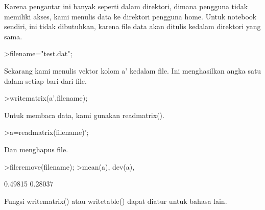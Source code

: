 \documentclass[a4paper,10pt]{article}
\begin{document}
\begin{eulernotebook}
\begin{eulercomment}
\begin{eulercomment}
\begin{eulercomment}
\begin{eulercomment}
\begin{eulercomment}
\begin{eulercomment}
\begin{eulercomment}
Karena pengantar ini banyak seperti dalam direktori, dimana pengguna
tidak memiliki akses, kami menulis data ke direktori pengguna home.
Untuk notebook sendiri, ini tidak dibutuhkan, karena file data akan
ditulis kedalam direktori yang sama.
\end{eulercomment}
\begin{eulerprompt}
>filename="test.dat";
\end{eulerprompt}
\begin{eulercomment}
Sekarang kami menulis vektor kolom a' kedalam file. Ini menghasilkan
angka satu dalam setiap bari dari file.
\end{eulercomment}
\begin{eulerprompt}
>writematrix(a',filename);
\end{eulerprompt}
\begin{eulercomment}
Untuk membaca data, kami gunakan readmatrix().
\end{eulercomment}
\begin{eulerprompt}
>a=readmatrix(filename)';
\end{eulerprompt}
\begin{eulercomment}
Dan menghapus file.
\end{eulercomment}
\begin{eulerprompt}
>fileremove(filename);
>mean(a), dev(a),
\end{eulerprompt}
\begin{euleroutput}
  0.49815
  0.28037
\end{euleroutput}
\begin{eulercomment}
Fungsi writematrix() atau writetable() dapat diatur untuk bahasa lain.


\end{eulercomment}
\end{eulercomment}
\end{eulercomment}
\end{eulercomment}
\end{eulercomment}
\end{eulercomment}
\end{eulercomment}
\end{eulernotebook}
\end{document}
